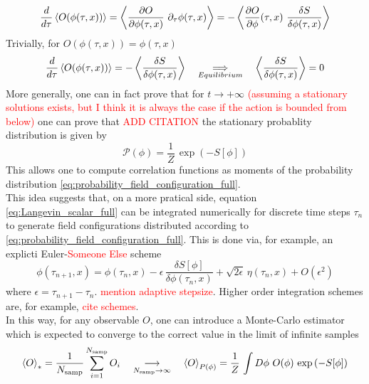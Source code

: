 \begin{equation*}
    \frac{d}{d\tau} \expect{O(\phi(\tau, x))} = \expect{\frac{\partial O}{\partial \phi(\tau, x)} \ \partial_\tau \phi(\tau, x)} = -\expect{\frac{\partial O}{\partial \phi}(\tau, x) \ \frac{\delta S}{\delta \phi(\tau, x)}}
\end{equation*}
Trivially, for $O(\phi(\tau, x)) = \phi(\tau, x)$
\begin{equation*}
    \frac{d}{d\tau} \left\langle O(\phi(\tau, x)) \right\rangle = -\left\langle \frac{\delta S}{\delta \phi(\tau, x)} \right\rangle \quad \underset{Equilibrium}{\Longrightarrow} \quad \left\langle \frac{\delta S}{\delta \phi(\tau, x)} \right\rangle = 0
\end{equation*}
More generally, one can in fact prove that for $t \to +\infty$ \textcolor{red}{(assuming a stationary solutions exists, but I think it is always the case if the action is bounded from below)} one can prove that \textcolor{red}{ADD CITATION} the stationary probablity distribution is given by
\begin{equation}
    \mathcal{P}(\phi) = \frac{1}{Z} \, \exp\left(-S[\phi]\right)
    \label{eq:probability_field_configuration_full}
\end{equation}
This allows one to compute correlation functions as moments of the  probability distribution \eqref{eq:probability_field_configuration_full}. \\
This idea suggests that, on a more pratical side, equation \ref{eq:Langevin_scalar_full} can be integrated numerically for discrete time steps $\tau_n$ to generate field configurations distributed according to \eqref{eq:probability_field_configuration_full}. This is done via, for example, an explicti Euler-\textcolor{red}{Someone Else} scheme
\begin{equation*}
    \phi(\tau_{n+1}, x) = \phi(\tau_{n}, x) - \epsilon \,  \frac{\delta S[\phi]}{\delta \phi (\tau_n, x)} + \sqrt{2\epsilon} \, \eta(\tau_n, x) + O(\epsilon^2)
\end{equation*}
where $\epsilon = \tau_{n+1} - \tau_n$. \textcolor{red}{mention adaptive stepsize}. Higher order integration schemes are, for example, \textcolor{red}{cite schemes}. \\
In this way, for any observable $O$, one can introduce a Monte-Carlo estimator which is expected to converge to the correct value in the limit of infinite samples
\begin{equation}
    \left\langle O \right\rangle_{*} = \frac{1}{N_\text{samp}} \sum^{N_\text{samp}}_{i=1} O_i \quad \underset{N_\text{samp} \to \infty}{\longrightarrow} \quad \left\langle O \right\rangle_{P(\phi)} = \frac{1}{Z} \, \int D\phi \ O(\phi) \, \exp\left(-S[\phi]\right)
    \label{eq:monte_carlo_estimator}
\end{equation}
